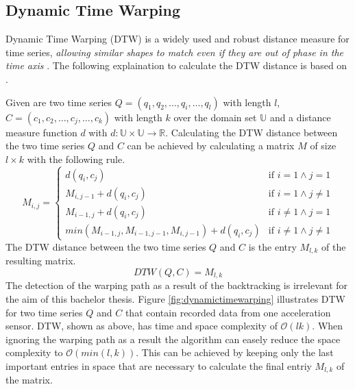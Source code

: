 \subsection{Dynamic Time Warping} \label{dynamic_time_warping}
Dynamic Time Warping (DTW) is a widely used and robust distance measure for time series, \textit{allowing similar shapes
to match even if they are out of phase in the time axis} \cite{keogh2002exact}. The following explaination to calculate
the DTW distance is based on \cite{sart2010accelerating}.

Given are two time series $Q = (q_1,\allowbreak q_2,\allowbreak \dots,\allowbreak q_i,\allowbreak \dots,\allowbreak q_l)$
with length $l$, $C = (c_1,\allowbreak c_2,\allowbreak \dots,\allowbreak c_j,\allowbreak \dots,\allowbreak c_k)$ with
length $k$ over the domain set $\mathbb{U}$ and a distance measure function $d$ with
$d: \mathbb{U} \times \mathbb{U} \to \mathbb{R}$. Calculating the DTW distance between the two time series $Q$ and $C$
can be achieved by calculating a matrix $M$ of size $l \times k$ with the following rule.
\begin{equation} \label{eq:dtw}
    M_{i, j} = \begin{cases}
        d(q_i,c_j) & \text{if } i = 1 \wedge j = 1\\
        M_{i,j-1} + d(q_i,c_j) & \text{if } i = 1 \wedge j \neq 1\\
        M_{i-1,j} + d(q_i,c_j) & \text{if } i \neq 1 \wedge j = 1\\
        min(M_{i-1,j}, M_{i-1,j-1}, M_{i,j-1}) + d(q_i,c_j) & \text{if } i \neq 1 \wedge j \neq 1
    \end{cases}
\end{equation}
The DTW distance between the two time series $Q$ and $C$ is the entry $M_{l,k}$ of the resulting matrix.
\begin{equation}
    DTW(Q, C) = M_{l,k}
\end{equation}
The detection of the warping path as a result of the backtracking is irrelevant for the aim of this bachelor thesis.
Figure \ref{fig:dynamictimewarping} illustrates DTW for two time series $Q$ and $C$ that contain recorded data from one
acceleration sensor. DTW, shown as above, has time and space complexity of $\mathcal{O}(lk)$. When ignoring the
warping path as a result the algorithm can easely reduce the space complexity to $\mathcal{O}(min(l, k))$. This can be
achieved by keeping only the last important entries in space that are necessary to calculate the final entriy $M_{l,k}$
of the matrix.

